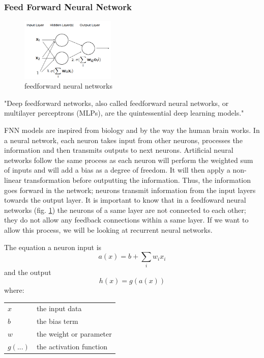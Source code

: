 \documentclass[letter]{article}\usepackage[]{graphicx}\usepackage[]{color}
\makeatletter
\newenvironment{conditions}
  {\par\vspace{\abovedisplayskip}\noindent\begin{tabular}{>{$}l<{$} @{${}={}$} l}}
  {\end{tabular}\par\vspace{\belowdisplayskip}}
\makeatother
\begin{document}
\subsubsection{Feed Forward Neural Network}
\begin{figure}
  \begin{center}
    \includegraphics[width=0.4\textwidth]{figure/feedforward_neural_networks.png}
  \end{center}
  \caption{feedforward neural networks}
  \label{fig:attention}
\end{figure}

"Deep feedforward networks, also called feedforward neural networks, or multilayer perceptrons (MLPs), are the quintessential deep learning models." \cite{Goodfellow-et-al-2016}

FNN models are inspired from biology and by the way the human brain works. In a neural network, each neuron takes input from other neurons, processes the information and then transmits outputs to next neurons. Artificial neural networks follow the same process as each neuron will perform the weighted sum of inputs and will add a bias as a degree of freedom. It will then apply a non-linear transformation before outputting the information. Thus, the information goes forward in the network; neurons transmit information from the input layers towards the output layer. It is important to know that in a feedfoward neural networks (fig. \ref{fig:attention}) the neurons of a same layer are not connected to each other; they do not allow any feedback connections within a same layer. If we want to allow this process, we will be looking at recurrent neural networks.

The equation a neuron input is  
\begin{equation}
a(x) = b +\sum_{i}{w_i x_i}
\end{equation}
and the output
\begin{equation}
h(x) = g(a(x))
\end{equation}
where:
\begin{conditions}
 x     &  the input data \\
 b     &  the bias term \\
 w     &  the weight or parameter \\   
 g(...) &  the activation function
\end{conditions}
\end{document}
